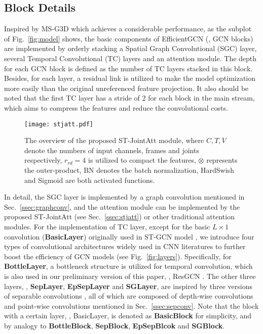 \documentclass[10pt,journal,compsoc]{IEEEtran}
\begin{document}
\subsection{Block Details}
\label{ssec:block}

Inspired by MS-G3D \cite{liu2020disentangling} which achieves a considerable performance, as the subplot of Fig.~\ref{fig:model} shows, the basic components of EfficientGCN (\ie, GCN blocks) are implemented by orderly stacking a Spatial Graph Convolutional (SGC) layer, several Temporal Convolutional (TC) layers and an attention module. The depth for each GCN block is defined as the number of TC layers stacked in this block. Besides, for each layer, a residual link is utilized to make the model optimization more easily than the original unreferenced feature projection. It also should be noted that the first TC layer has a stride of 2 for each block in the main stream, which aims to compress the features and reduce the convolutional costs.

\begin{figure*}[t]
  \centerline{\texttt{[image: stjatt.pdf]}}
  \vspace{-0.4cm}
  \caption{The overview of the proposed ST-JointAtt module, where $C,T,V$ denote the numbers of input channels, frames and joints respectively, $r_{rd}=4$ is utilized to compact the features, $\otimes$ represents the outer-product, BN denotes the batch normalization, HardSwish \cite{howard2019searching} and Sigmoid are both activated functions. \bv}\label{fig:stjatt}
  \vspace{-0.4cm}
\end{figure*}

In detail, the SGC layer is implemented by a graph convolution mentioned in Sec.~\ref{ssec:graphconv}, and the attention module can be implemented by the proposed ST-JointAtt (see Sec.~\ref{ssec:stjatt}) or other traditional attention modules. For the implementation of TC layer, except for the basic $L\times1$ convolution ({\bf BasicLayer}) originally used in ST-GCN model \cite{yan2018spatial}, we introduce four types of convolutional architectures widely used in CNN literatures to further boost the efficiency of GCN models (see Fig.~\ref{fig:layers}). Specifically, for {\bf BottleLayer}, a bottleneck structure \cite{he2016deep} is utilized for temporal convolution, which is also used in our preliminary version of this paper, \ie, ResGCN \cite{song2020stronger}. The other three layers, \ie, {\bf SepLayer}, {\bf EpSepLayer} and {\bf SGLayer}, are inspired by three versions of separable convolutions \cite{howard2017mobilenets,sandler2018mobilenetv2,zhou2020rethinking}, all of which are composed of depth-wise convolutions and point-wise convolutions mentioned in Sec.~\ref{ssec:sepconv}. Note that the block with a certain layer, \eg, BasicLayer, is denoted as {\bf BasicBlock} for simplicity, and by analogy to {\bf BottleBlock}, {\bf SepBlock}, {\bf EpSepBlcok} and {\bf SGBlock}.
\end{document}
